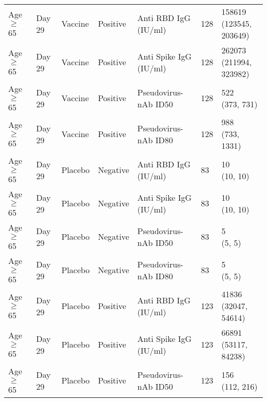 \documentclass[]{book}
\theoremstyle{definition}
\theoremstyle{definition}
\theoremstyle{definition}
\newcommand{\1}{\mathbbm{1}}
\begin{document}
\begin{landscape}
\begin{ThreePartTable}
\begin{longtable}[t]{>{\raggedright\arraybackslash}p{7cm}llllll}
\hspace{1em}Age $\geq$ 65 & Day 29 & Vaccine & Positive & Anti RBD IgG (IU/ml) & 128 & \makecell[l]{158619\\(123545, 203649)}\\
\hspace{1em}Age $\geq$ 65 & Day 29 & Vaccine & Positive & Anti Spike IgG (IU/ml) & 128 & \makecell[l]{262073\\(211994, 323982)}\\
\hspace{1em}Age $\geq$ 65 & Day 29 & Vaccine & Positive & Pseudovirus-nAb ID50 & 128 & \makecell[l]{522\\(373, 731)}\\
\hspace{1em}Age $\geq$ 65 & Day 29 & Vaccine & Positive & Pseudovirus-nAb ID80 & 128 & \makecell[l]{988\\(733, 1331)}\\
\hspace{1em}Age $\geq$ 65 & Day 29 & Placebo & Negative & Anti RBD IgG (IU/ml) & 83 & \makecell[l]{10\\(10, 10)}\\
\hspace{1em}Age $\geq$ 65 & Day 29 & Placebo & Negative & Anti Spike IgG (IU/ml) & 83 & \makecell[l]{10\\(10, 10)}\\
\hspace{1em}Age $\geq$ 65 & Day 29 & Placebo & Negative & Pseudovirus-nAb ID50 & 83 & \makecell[l]{5\\(5, 5)}\\
\hspace{1em}Age $\geq$ 65 & Day 29 & Placebo & Negative & Pseudovirus-nAb ID80 & 83 & \makecell[l]{5\\(5, 5)}\\
\hspace{1em}Age $\geq$ 65 & Day 29 & Placebo & Positive & Anti RBD IgG (IU/ml) & 123 & \makecell[l]{41836\\(32047, 54614)}\\
\hspace{1em}Age $\geq$ 65 & Day 29 & Placebo & Positive & Anti Spike IgG (IU/ml) & 123 & \makecell[l]{66891\\(53117, 84238)}\\
\hspace{1em}Age $\geq$ 65 & Day 29 & Placebo & Positive & Pseudovirus-nAb ID50 & 123 & \makecell[l]{156\\(112, 216)}\\

\end{longtable}
\end{ThreePartTable}
\end{landscape}
\end{document}
